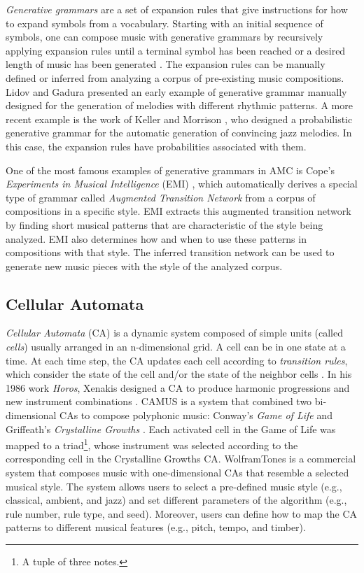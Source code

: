 \textit{Generative grammars} are a set of expansion rules that give instructions for how to expand symbols from a vocabulary. Starting with an initial sequence of symbols, one can compose music with generative grammars by recursively applying expansion rules until a terminal symbol has been reached or a desired length of music has been generated \cite{holtzman1981using}. The expansion rules can be manually defined or inferred from analyzing a corpus of pre-existing music compositions. Lidov and Gadura \cite{lidov1973melody} presented an early example of generative grammar manually designed for the generation of melodies with different rhythmic patterns. A more recent example is the work of Keller and Morrison \cite{keller2007grammatical}, who designed a probabilistic generative grammar for the automatic generation of convincing jazz melodies. In this case, the expansion rules have probabilities associated with them.

One of the most famous examples of generative grammars in AMC is Cope's \textit{Experiments in Musical Intelligence} (EMI) \cite{cope1989experiments}, which automatically derives a special type of grammar called \textit{Augmented Transition Network} from a corpus of compositions in a specific style. EMI extracts this augmented transition network by finding short musical patterns that are characteristic of the style being analyzed. EMI also determines how and when to use these patterns in compositions with that style. The inferred transition network can be used to generate new music pieces with the style of the analyzed corpus.

\subsection{Cellular Automata}

\textit{Cellular Automata} (CA) is a dynamic system composed of simple units (called \textit{cells}) usually arranged in an n-dimensional grid. A cell can be in one state at a time. At each time step, the CA updates each cell according to \textit{transition rules}, which consider the state of the cell and/or the state of the neighbor cells \cite{wolfram2002new}. In his 1986 work \textit{Horos}, Xenakis designed a CA to produce harmonic progressions and new instrument combinations \cite{solomos2005cellular}. CAMUS \cite{miranda1993cellular} is a system that combined two bi-dimensional CAs to compose polyphonic music: Conway's \textit{Game of Life} \cite{gardner1970} and Griffeath’s \textit{Crystalline Growths} \cite{dewdney1989}. Each activated cell in the Game of Life was mapped to a triad\footnote{A tuple of three notes.}, whose instrument was selected according to the corresponding cell in the Crystalline Growths CA. WolframTones \cite{ball2005making} is a commercial system that composes music with one-dimensional CAs that resemble a selected musical style. The system allows users to select a pre-defined music style (e.g., classical, ambient, and jazz) and set different parameters of the algorithm (e.g., rule number, rule type, and seed). Moreover, users can define how to map the CA patterns to different musical features (e.g., pitch, tempo, and timber).

